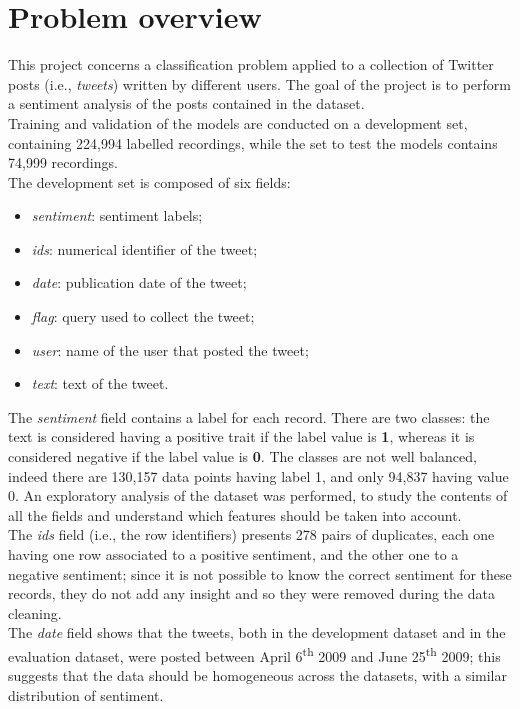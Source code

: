 \documentclass[conference]{IEEEtran}
\begin{document}
\section{Problem overview}
This project concerns a classification problem applied to a collection of Twitter posts (i.e., \textit{tweets}) written by different users. The goal of the project is to perform a sentiment analysis of the posts contained in the dataset.\\
Training and validation of the models are conducted on a development set, containing 224,994 labelled recordings, while the set to test the models contains 74,999 recordings.\\
The development set is composed of six fields:
\begin{itemize}
    \item \textit{sentiment}: sentiment labels;
    \item \textit{ids}: numerical identifier of the tweet;
    \item \textit{date}: publication date of the tweet;
    \item \textit{flag}: query used to collect the tweet;
    \item \textit{user}: name of the user that posted the tweet;
    \item \textit{text}: text of the tweet. 
\end{itemize}
The \textit{sentiment} field contains a label for each record. There are two classes: the text is considered having a positive trait if the label value is \textbf{1}, whereas it is considered negative if the label value is \textbf{0}. The classes are not well balanced, indeed there are 130,157 data points having label 1, and only 94,837 having value 0. An exploratory analysis of the dataset was performed, to study the contents of all the fields and understand which features should be taken into account.\\
The \textit{ids} field (i.e., the row identifiers) presents 278 pairs of duplicates, each one having one row associated to a positive sentiment, and the other one to a negative sentiment; since it is not possible to know the correct sentiment for these records, they do not add any insight and so they were removed during the data cleaning. \\
The \textit{date} field shows that the tweets, both in the development dataset and in the evaluation dataset, were posted between April 6\textsuperscript{th} 2009 and June 25\textsuperscript{th} 2009; this suggests that the data should be homogeneous across the datasets, with a similar distribution of sentiment. \\
\end{document}
